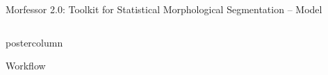 \documentclass[final]{beamer} %
\newcommand{\seq}[1]{\boldsymbol{#1}}
\newcommand{\params}{\boldsymbol{\theta}}
\newcommand{\hatdata}{\seq{\hat{D}}}
\newcommand{\token}{\phi}
\begin{document}
\begin{frame}{Morfessor 2.0: Toolkit for Statistical Morphological Segmentation -- Model}
\begin{columns}
\begin{column}{.3\textwidth}
\begin{beamercolorbox}[center,wd=\textwidth]{postercolumn}
\begin{block}{Workflow}
{\begin{tikzpicture}[yscale=2,thick,>=latex]
\end{tikzpicture}}            \end{block}
            
	\end{beamercolorbox}










\end{column}
\begin{column}{.3\textwidth}



\end{column}
\end{columns}
\end{frame}
\end{document}
